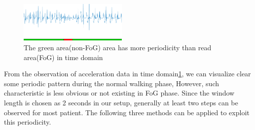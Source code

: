 \documentclass[article]{article}
\begin{document}
\begin{figure}
\centering
\includegraphics[width=0.47\textwidth]{periodic}
\caption{The green area(non-FoG) area has more periodicity than read area(FoG) in time domain}
\label{fig:periodic}
\end{figure}	
From the observation of acceleration data in time domain\ref{fig:periodic}, we can visualize clear some periodic pattern during the normal walking phase, However, such characteristic is less obvious or not existing in FoG phase. Since the window length is chosen as 2 seconds in our setup, generally at least two steps can be observed for most patient. The following three methods can be applied to exploit this periodicity.
\end{document}
